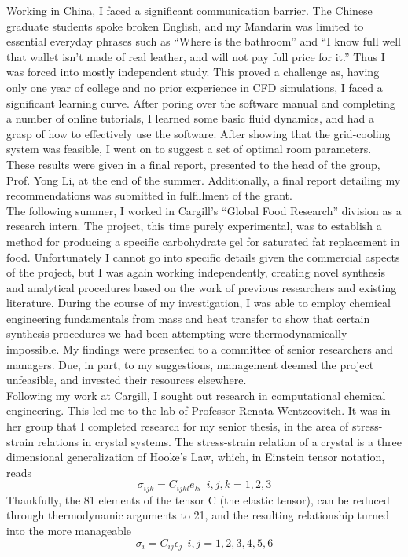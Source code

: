 \documentclass[11pt]{article}
\begin{document}
Working in China, I faced a significant communication barrier. The Chinese graduate students spoke broken English, and my Mandarin was limited to essential everyday phrases such as “Where is the bathroom” and “I know full well that wallet isn’t made of real leather, and will not pay full price for it.” Thus I was forced into mostly independent study. This proved a challenge as, having only one year of college and no prior experience in CFD simulations, I faced a significant learning curve. After poring over the software manual and completing a number of online tutorials, I learned some basic fluid dynamics, and had a grasp of how to effectively use the software. After showing that the grid-cooling system was feasible, I went on to suggest a set of optimal room parameters. These results were given in a final report, presented to the head of the group, Prof. Yong Li, at the end of the summer. Additionally, a final report detailing my recommendations was submitted in fulfillment of the grant.\\

The following summer, I worked in Cargill’s “Global Food Research” division as a research intern. The project, this time purely experimental, was to establish a method for producing a specific carbohydrate gel for saturated fat replacement in food. Unfortunately I cannot go into specific details given the commercial aspects of the project, but I was again working independently, creating novel synthesis and analytical procedures based on the work of previous researchers and existing literature. During the course of my investigation, I was able to employ chemical engineering fundamentals from mass and heat transfer to show that certain synthesis procedures we had been attempting were thermodynamically impossible. My findings were presented to a committee of senior researchers and managers. Due, in part, to my suggestions, management deemed the project unfeasible, and invested their resources elsewhere.\\

Following my work at Cargill, I sought out research in computational chemical engineering. This led me to the lab of Professor Renata Wentzcovitch. It was in her group that I completed research for my senior thesis, in the area of stress-strain relations in crystal systems. The stress-strain relation of a crystal is a three dimensional generalization of Hooke’s Law, which, in Einstein tensor notation, reads
\[
\sigma_{ijk}=C_{ijkl}e_{kl}  \ \ i,j,k = 1,2,3
\]
Thankfully, the 81 elements of the tensor C (the elastic tensor), can be reduced through thermodynamic arguments to 21, and the resulting relationship turned into the more manageable
\[
\sigma_{i}=C_{ij}\epsilon_{j} \ \ i,j=1,2,3,4,5,6
\]
\end{document}
